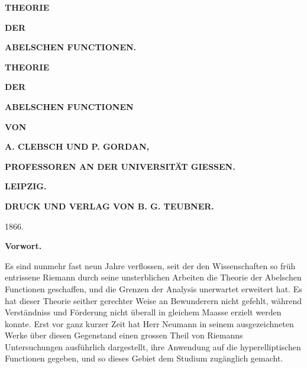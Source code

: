 \documentclass[10pt]{article}
\begin{document}
\small


\begin{center}
{\Large\bfseries THEORIE}\par\vspace{1.2em}
{\small\bfseries DER}\par\vspace{1.5em}
{\Large\bfseries ABELSCHEN FUNCTIONEN.}
\end{center}

\clearpage

\begin{center}
{\Large\bfseries THEORIE}\par\vspace{1.3em}
{\small\bfseries DER}\par\vspace{1.4em}
{\LARGE\bfseries ABELSCHEN FUNCTIONEN}\par\vspace{2.2em}
{\small\bfseries VON}\par\vspace{1.8em}
{\large\bfseries A. CLEBSCH \quad UND \quad P. GORDAN,}\par
{\scriptsize\bfseries PROFESSOREN AN DER UNIVERSITÄT GIESSEN.}\par\vfill
{\Large\bfseries LEIPZIG.}\par
{\bfseries DRUCK UND VERLAG VON B. G. TEUBNER.}\par
{\large 1866.}
\end{center}

\clearpage

\begin{center}
{\Large\bfseries Vorwort.}
\end{center}

Es sind nunmehr fast neun Jahre verflossen, seit der den Wissenschaften so früh entrissene Riemann durch seine unsterblichen Arbeiten die Theorie der Abelschen Functionen geschaffen, und die Grenzen der Analysis unerwartet erweitert hat. Es hat dieser Theorie seither gerechter Weise an Bewunderern nicht gefehlt, während Verständniss und Förderung nicht überall in gleichem Maasse erzielt werden konnte. Erst vor ganz kurzer Zeit hat Herr Neumann in seinem ausgezeichneten Werke über diesen Gegenstand einen grossen Theil von Riemanns Untersuchungen ausführlich dargestellt, ihre Anwendung auf die hyperelliptischen Functionen gegeben, und so dieses Gebiet dem Studium zugänglich gemacht.
\end{document}
